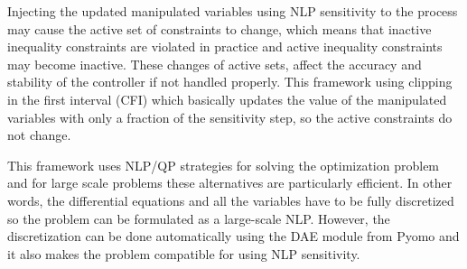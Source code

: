 \documentclass{article}
\begin{document}
\par
Injecting the updated manipulated variables using NLP sensitivity to the process may cause the active set of constraints to change, which means that inactive inequality constraints are violated in practice and active inequality constraints may become inactive.
These changes of active sets, affect the accuracy and stability of the controller if not handled properly.
This framework using clipping in the first interval (CFI) which basically updates the value of the manipulated variables with only a fraction of the sensitivity step, so the active constraints do not change.
\par
This framework uses NLP/QP strategies for solving the optimization problem and for large scale problems these alternatives are particularly efficient.
In other words, the differential equations and all the variables have to be fully discretized so the problem can be formulated as a large-scale NLP.
However, the discretization can be done automatically using the DAE module from Pyomo and it also makes the problem compatible for using NLP sensitivity.
\end{document}
